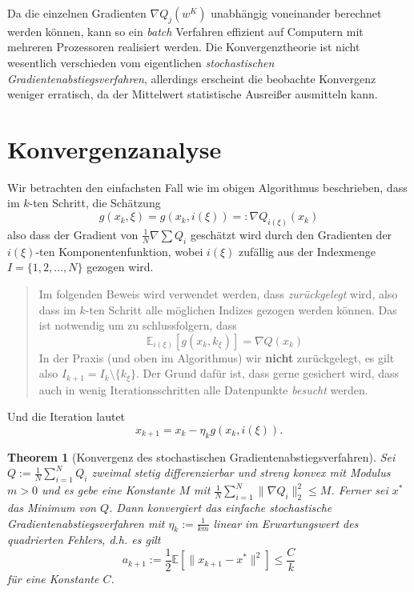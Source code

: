 \documentclass[
]{book}
\newenvironment {JHSAYS} [0] {\begin{quote}\color{jhsc}} {\end{quote}}
\newtheorem{theorem}{Theorem}[chapter]
\theoremstyle{definition}
\theoremstyle{definition}
\theoremstyle{definition}
\theoremstyle{definition}
\theoremstyle{remark}
\begin{document}
Da die einzelnen Gradienten \(\nabla Q_j(w^K)\) unabhängig voneinander berechnet werden können, kann so ein \emph{batch} Verfahren effizient auf Computern mit mehreren Prozessoren realisiert werden. Die Konvergenztheorie ist nicht wesentlich verschieden vom eigentlichen \emph{stochastischen Gradientenabstiegsverfahren}, allerdings erscheint die beobachte Konvergenz weniger erratisch, da der Mittelwert statistische Ausreißer ausmitteln kann.

\hypertarget{konvergenzanalyse}{%
\section{Konvergenzanalyse}\label{konvergenzanalyse}}

Wir betrachten den einfachsten Fall wie im obigen Algorithmus beschrieben, dass im \(k\)-ten Schritt, die Schätzung
\[g(x_k, \xi)=g(x_k, i(\xi))=:\nabla Q_{i(\xi)}(x_k)\]
also dass der Gradient von \(\frac 1N \nabla \sum Q_i\) geschätzt wird durch den Gradienten der \(i(\xi)\)-ten Komponentenfunktion, wobei \(i(\xi)\) zufällig aus der Indexmenge \(I=\{1, 2, \dotsc, N\}\) gezogen wird.

\leavevmode{}%
\begin{JHSAYS}
Im folgenden Beweis wird verwendet werden, dass \emph{zurückgelegt} wird, also dass im \(k\)-ten Schritt alle möglichen Indizes gezogen werden können. Das ist notwendig um zu schlussfolgern, dass
\begin{equation*}
\mathbb E_{i(\xi)} [g(x_k, k_\xi)] = \nabla Q(x_k)
\end{equation*}
In der Praxis (und oben im Algorithmus) wir \textbf{nicht} zurückgelegt, es gilt also \(I_{k+1} = I_k \setminus \{k_\xi\}\). Der Grund dafür ist, dass gerne gesichert wird, dass auch in wenig Iterationsschritten alle Datenpunkte \emph{besucht} werden.

\end{JHSAYS}

Und die Iteration lautet
\begin{equation*}
x_{k+1} = x_k - \eta_k g(x_k, i(\xi)).
\end{equation*}

\begin{theorem}[Konvergenz des stochastischen Gradientenabstiegsverfahren]
\protect\hypertarget{thm:thm-convergence-stoch-grad}{}\label{thm:thm-convergence-stoch-grad}Sei \(Q:=\frac 1N \sum_{i=1}^NQ_i\) zweimal stetig differenzierbar und \emph{streng konvex} mit \emph{Modulus} \(m>0\) und es gebe eine Konstante \(M\) mit \(\frac 1N \sum_{i=1}^N \|\nabla Q_i \|_2^2 \leq M\). Ferner sei
\(x^*\) das Minimum von \(Q\). Dann konvergiert das einfache stochastische Gradientenabstiegsverfahren mit \(\eta_k := \frac{1}{km}\) linear im Erwartungswert des quadrierten Fehlers, d.h. es gilt
\begin{equation*}
a_{k+1} := \frac 12 \mathbb E [\| x_{k+1} - x^*\|^2 ] \leq \frac {C}{k}
\end{equation*}
für eine Konstante \(C\).
\end{theorem}
\end{document}
